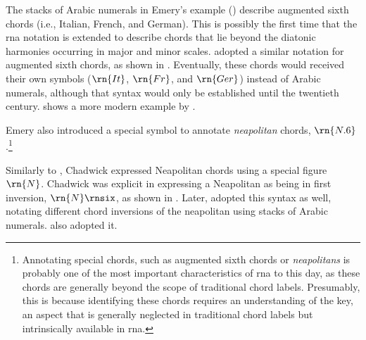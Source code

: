


The stacks of Arabic numerals in Emery's example
() describe
augmented sixth chords (i.e., Italian, French, and German).
This is possibly the first time that the \gls{rna} notation
is extended to describe chords that lie beyond the diatonic
harmonies occurring in major and minor scales.
\textcite{shepard1896harmony} adopted a similar notation for
augmented sixth chords, as shown in
. Eventually,
these chords would received their own symbols ($\rn{It}$,
$\rn{Fr}$, and $\rn{Ger}$) instead of Arabic numerals,
although that syntax would only be established until the
twentieth century.
 shows a more
modern example by \textcite{goldman1965harmony}.



Emery also introduced a special symbol to annotate
\emph{neapolitan} chords, $\rn{N.6}$.\footnote{Annotating
special chords, such as augmented sixth chords or
\emph{neapolitans} is probably one of the most important
characteristics of \gls{rna} to this day, as these chords
are generally beyond the scope of traditional chord labels.
Presumably, this is because identifying these chords
requires an understanding of the key, an aspect that is
generally neglected in traditional chord labels but
intrinsically available in \gls{rna}.}

Similarly to \textcite{emery1879elements}, Chadwick
expressed Neapolitan chords using a special figure $\rn{N}$.
Chadwick was explicit in expressing a Neapolitan as being in
first inversion, $\rn{N}\rnsix$, as shown in
. Later,
\textcite{heacox1907lessons} adopted this syntax as well,
notating different chord inversions of the neapolitan using
stacks of Arabic numerals. \textcite{alchin1921applied} also
adopted it.


